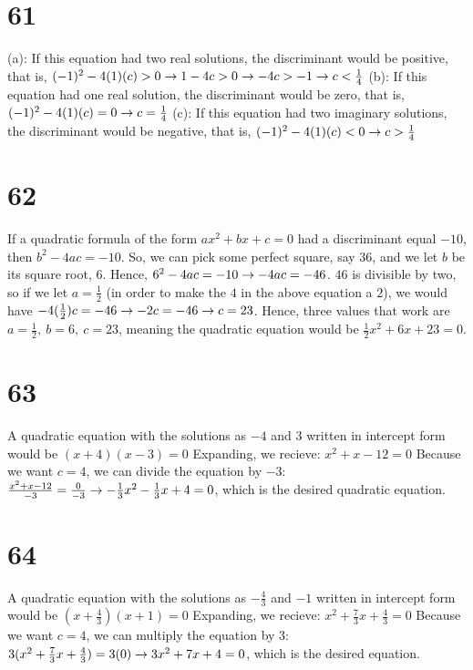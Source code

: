 \documentclass{article}
\theoremstyle{definition}
\begin{document}
\section*{61}
(a): If this equation had two real solutions, the discriminant would be positive, that is, 
$(-1)^2-4(1)(c)>0\newline\rightarrow 
1-4c>0\newline\rightarrow 
-4c>-1\newline\rightarrow 
c<\frac{1}{4}$\newline 
(b): If this equation had one real solution, the discriminant would be zero, that is, 
$(-1)^2-4(1)(c)=0\newline\rightarrow 
c=\frac{1}{4}$\newline
(c): If this equation had two imaginary solutions, the discriminant would be negative, that is, 
$(-1)^2-4(1)(c)<0\newline\rightarrow 
c>\frac{1}{4}$

\section*{62}
If a quadratic formula of the form $ax^2+bx+c=0$ had a discriminant equal $-10$, then $b^2-4ac=-10$. So, we can pick some perfect square, say $36$, 
and we let $b$ be its square root, $6$. Hence, $6^2-4ac=-10\newline\rightarrow -4ac=-46$. $46$ is divisible by two, so if we let $a=\frac{1}{2}$ (in order
 to make the $4$ in the above equation a $2$), we would have $-4(\frac{1}{2})c=-46\newline\rightarrow -2c=-46\newline\rightarrow c=23$. Hence, 
three values that work are $a=\frac{1}{2},\ b=6,\ c=23$, meaning the quadratic equation would be $\frac{1}{2}x^2+6x+23=0$.

\section*{63}
A quadratic equation with the solutions as $-4$ and $3$ written in intercept form would be $(x+4)(x-3)=0$ Expanding, we recieve:\newline 
$x^2+x-12=0$ Because we want $c=4$, we can divide the equation by $-3$:\newline $\frac{x^2+x-12}{-3}=\frac{0}{-3}\newline\rightarrow 
-\frac{1}{3}x^2-\frac{1}{3}x+4=0$, which is the desired quadratic equation.

\section*{64}
A quadratic equation with the solutions as $-\frac{4}{3}$ and $-1$ written in intercept form would be $(x+\frac{4}{3})(x+1)=0$ Expanding, we recieve:\newline
$x^2+\frac{7}{3}x+\frac{4}{3}=0$ Because we want $c=4$, we can multiply the equation by $3$:\newline 
$3(x^2+\frac{7}{3}x+\frac{4}{3})=3(0)\newline\rightarrow 
3x^2+7x+4=0$, which is the desired equation.
\end{document}
